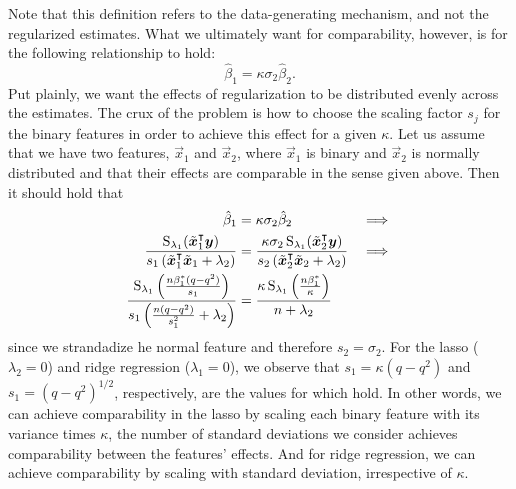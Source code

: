 Note that this definition refers to the data-generating mechanism, and not the regularized estimates.
What we ultimately want for comparability, however, is for the following relationship to hold:
\[
  \hat{\beta}_1 = \kappa \sigma_{2}\hat{\beta}_2.
\]
Put plainly, we want the effects of regularization to be distributed evenly across the estimates.
The crux of the problem is how to choose the scaling factor \(s_j\) for the binary features in order to achieve this effect for a given \(\kappa\).
Let us assume that we have two features, \(\vec{x}_1\) and \(\vec{x}_2\), where \(\vec{x}_1\) is binary and \(\vec{x}_2\) is normally distributed and that their effects are comparable in the sense given above.
Then it should hold that
\begin{alignat}{3}
  \label{eq:comparable-effects}
  \hat{\beta}_1                                                                                                                          & = \kappa \sigma_2\hat{\beta}_2                                                                                                                           & \implies \nonumber \\
  \frac{\operatorname{S}_{\lambda_1}(\tilde{\boldsymbol{x}}_1^\intercal \boldsymbol{y})}{s_1\left(\tilde{\boldsymbol{x}}_1^\intercal \tilde{\boldsymbol{x}}_1 + \lambda_2\right)} & = \frac{\kappa \sigma_2 \operatorname{S}_{\lambda_1}(\tilde{\boldsymbol{x}}_2^\intercal \boldsymbol{y})}{s_2\left(\tilde{\boldsymbol{x}}_2^\intercal \tilde{\boldsymbol{x}}_2 + \lambda_2\right)} & \implies \nonumber \\
  \frac{\operatorname{S}_{\lambda_1}\left(\frac{n\beta_1^* (q - q^2)}{s_1}\right)}{s_1\left(\frac{n(q - q^2)}{s_1^2} + \lambda_2\right)}              & = \frac{\kappa \operatorname{S}_{\lambda_1}\left(\frac{n\beta_1^*}{\kappa} \right)}{n + \lambda_2}
\end{alignat}
since we strandadize he normal feature and therefore \(s_2 = \sigma_2\).
For the lasso (\(\lambda_2 = 0\)) and ridge regression (\(\lambda_1=0\)), we observe that \(s_1 = \kappa (q - q^2)\) and \(s_1 = (q - q^2)^{1/2}\), respectively, are the values for which  hold.
In other words, we can achieve comparability in the lasso by scaling each binary feature with its variance times \(\kappa\), the number of standard deviations we consider achieves comparability between the features' effects.
And for ridge regression, we can achieve comparability by scaling with standard deviation, irrespective of \(\kappa\).

